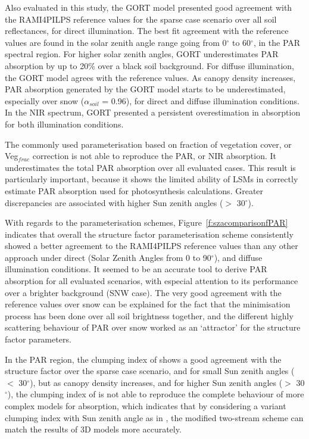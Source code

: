 \documentclass[a4paper,11pt]{report}
\begin{document}
Also evaluated in this study, the GORT model presented good agreement with the RAMI4PILPS reference values for the sparse case scenario over all soil reflectances, for direct illumination. The best fit agreement with the reference values are found in the solar zenith angle range going from 0$^{\circ}$ to 60$^{\circ}$, in the PAR spectral region. For higher solar zenith angles, GORT underestimates PAR absorption by up to 20\% over a black soil background. For diffuse illumination, the GORT model agrees with the reference values. As canopy density increases, PAR absorption generated by the GORT model starts to be underestimated, especially over snow ($\alpha_{soil}$ = 0.96), for direct and diffuse illumination conditions. In the NIR spectrum, GORT presented a persistent overestimation in absorption for both illumination conditions.

The commonly used parameterisation based on fraction of vegetation cover, or Veg$_{frac}$ correction is not able to reproduce the PAR, or NIR absorption. It underestimates the total PAR absorption over all evaluated cases. This result is particularly important, because it shows the limited ability of LSMs in correctly estimate PAR absorption used for photosynthesis calculations. Greater discrepancies are associated with higher Sun zenith angles ($>$ 30$^{\circ}$).

With regards to the parameterisation schemes, Figure~\ref{f:szacomparisonfPAR} indicates that overall the structure factor parameterisation scheme \citep{pinty2006} consistently showed a better agreement to the RAMI4PILPS reference values than any other approach under direct (Solar Zenith Angles from 0 to 90$^{\circ}$), and diffuse illumination conditions. It seemed to be an accurate tool to derive PAR absorption for all evaluated scenarios, with especial attention to its performance over a brighter background (SNW case). The very good agreement with the reference values over snow can be explained for the fact that the minimisation process has been done over all soil brightness together, and the different highly scattering behaviour of PAR over snow worked as an `attractor' for the structure factor parameters.

In the PAR region, the clumping index of \citet{Nilson1971} shows a good agreement with the structure factor over the sparse case scenario, and for small Sun zenith angles ($<$ 30$^{\circ}$), but as canopy density increases, and for higher Sun zenith angles ($>$ 30$^{\circ}$), the clumping index of \citet{Nilson1971} is not able to reproduce the complete behaviour of more complex models for absorption, which indicates that by considering a variant clumping index with Sun zenith angle as in \citet{pinty2006}, the modified two-stream scheme can match the results of 3D models more accurately. 
\end{document}
